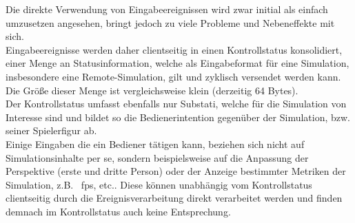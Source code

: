 Die direkte Verwendung von Eingabeereignissen wird zwar initial als einfach umzusetzen angesehen, bringt jedoch zu viele Probleme und Nebeneffekte mit sich.\\
Eingabeereignisse werden daher clientseitig in einen Kontrollstatus konsolidiert, einer Menge an Statusinformation, welche als Eingabeformat für eine Simulation, insbesondere eine Remote-Simulation, gilt und zyklisch versendet werden kann. Die Größe dieser Menge ist vergleichsweise klein (derzeitig 64 Bytes).\\
Der Kontrollstatus umfasst ebenfalls nur Substati, welche für die Simulation von Interesse sind und bildet so die Bedienerintention gegenüber der Simulation, bzw. seiner Spielerfigur ab.\\
Einige Eingaben die ein Bediener tätigen kann, beziehen sich nicht auf Simulationsinhalte per se, sondern beispielsweise auf die Anpassung der Perspektive (erste und dritte Person) oder der Anzeige bestimmter Metriken der Simulation, z.B.~ fps, etc.. Diese können unabhängig vom Kontrollstatus clientseitig durch die Ereignisverarbeitung direkt verarbeitet werden und finden demnach im Kontrollstatus auch keine Entsprechung.\\

